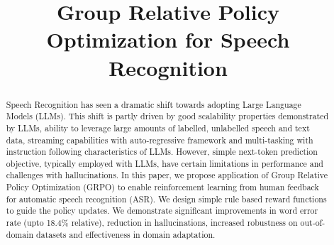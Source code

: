 \documentclass[conference]{IEEEtran}
\begin{document}
\title{Group Relative Policy Optimization for Speech Recognition}




\author{
}





\maketitle

\begin{abstract}
Speech Recognition has seen a dramatic shift towards adopting Large Language Models (LLMs). This shift is partly driven by good scalability properties demonstrated by LLMs, ability to leverage large amounts of labelled, unlabelled speech and text data, streaming capabilities with auto-regressive framework and multi-tasking with instruction following characteristics of LLMs. However, simple next-token prediction objective, typically employed with LLMs, have certain limitations in performance and challenges with hallucinations. In this paper, we propose application of Group Relative Policy Optimization (GRPO) to enable reinforcement learning from human feedback for automatic speech recognition (ASR). We design simple rule based reward functions to guide the policy updates. We demonstrate significant improvements in word error rate (upto 18.4\% relative), reduction in hallucinations, increased robustness on out-of-domain datasets and effectiveness in domain adaptation.
\end{abstract}
\end{document}
